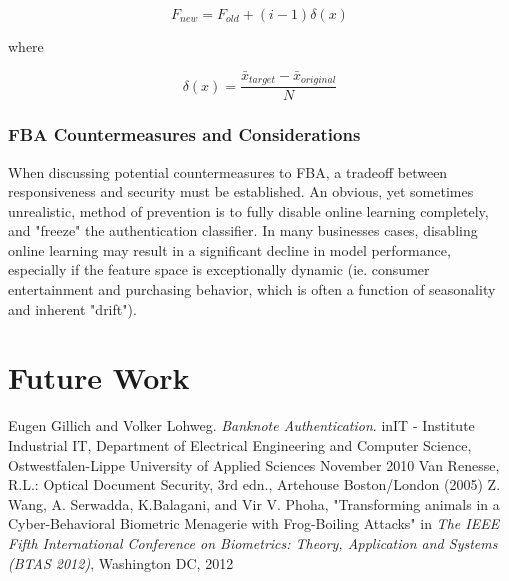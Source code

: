 \documentclass{article}
\begin{document}
\begin{equation}
F_{new} = F_{old} + (i - 1)\delta(x)
\end{equation}

where

\begin{equation}
\delta(x) = \frac{\bar{x}_{target}-\bar{x}_{original}}{N}
\end{equation}

\subsubsection{FBA Countermeasures and Considerations}


When discussing potential countermeasures to FBA, a tradeoff between responsiveness and security must be established. An obvious, yet sometimes unrealistic, method of prevention is to fully disable online learning completely, and "freeze" the authentication classifier. In many businesses cases, disabling online learning may result in a significant decline in model performance, especially if the feature space is exceptionally dynamic (ie. consumer entertainment and purchasing behavior, which is often a function of seasonality and inherent "drift").

\section{Future Work}

\begin{thebibliography}{9}
Eugen Gillich and Volker Lohweg. \textit{Banknote Authentication}. inIT - Institute Industrial IT, Department of Electrical Engineering and Computer Science, Ostwestfalen-Lippe University of Applied Sciences
November 2010
Van Renesse, R.L.: Optical Document Security, 3rd edn., Artehouse Boston/London
(2005)
 Z. Wang, A. Serwadda, K.Balagani, and Vir V. Phoha, "Transforming animals in a Cyber-Behavioral Biometric Menagerie with Frog-Boiling Attacks" in \textit{The IEEE Fifth International Conference on Biometrics: Theory, Application and Systems (BTAS 2012)}, Washington DC, 2012
\end{thebibliography}
\end{document}
